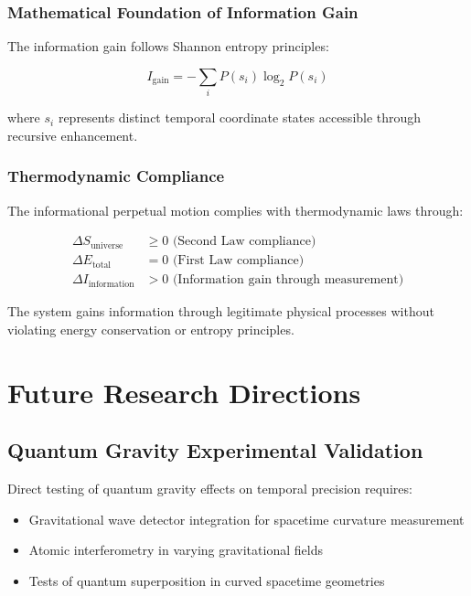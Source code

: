 \documentclass[11pt]{article}
\theoremstyle{remark}
\begin{document}
\subsubsection{Mathematical Foundation of Information Gain}

The information gain follows Shannon entropy principles:

$$I_{\text{gain}} = -\sum_{i} P(s_i) \log_2 P(s_i)$$

where $s_i$ represents distinct temporal coordinate states accessible through recursive enhancement.

\subsubsection{Thermodynamic Compliance}

The informational perpetual motion complies with thermodynamic laws through:

\begin{align}
\Delta S_{\text{universe}} &\geq 0 \text{ (Second Law compliance)} \\
\Delta E_{\text{total}} &= 0 \text{ (First Law compliance)} \\
\Delta I_{\text{information}} &> 0 \text{ (Information gain through measurement)}
\end{align}

The system gains information through legitimate physical processes without violating energy conservation or entropy principles.

\section{Future Research Directions}

\subsection{Quantum Gravity Experimental Validation}

Direct testing of quantum gravity effects on temporal precision requires:

\begin{itemize}
\item Gravitational wave detector integration for spacetime curvature measurement
\item Atomic interferometry in varying gravitational fields
\item Tests of quantum superposition in curved spacetime geometries
\end{itemize}
\end{document}
